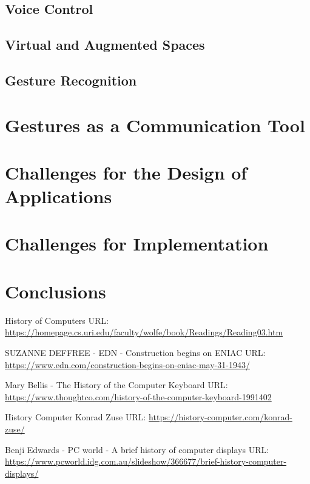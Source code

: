 \documentclass{article}
\begin{document}
\subsection{Voice Control}

\subsection{Virtual and Augmented Spaces}

\subsection{Gesture Recognition}

\section{Gestures as a Communication Tool}

\section{Challenges for the Design of Applications}

\section{Challenges for Implementation}

\section{Conclusions}

 \newpage
 \begin{thebibliography}{00}
    
 History of Computers
\newline
URL: \url{https://homepage.cs.uri.edu/faculty/wolfe/book/Readings/Reading03.htm}

 SUZANNE DEFFREE - EDN - Construction begins on ENIAC
\newline
URL: \url{https://www.edn.com/construction-begins-on-eniac-may-31-1943/}

 Mary Bellis - The History of the Computer Keyboard
\newline
URL: \url{https://www.thoughtco.com/history-of-the-computer-keyboard-1991402}

 History Computer Konrad Zuse
\newline
URL: \url{https://history-computer.com/konrad-zuse/}


 Benji Edwards - PC world - A brief history of computer displays
\newline
URL: \url{https://www.pcworld.idg.com.au/slideshow/366677/brief-history-computer-displays/}

\end{thebibliography}

\end{document}
